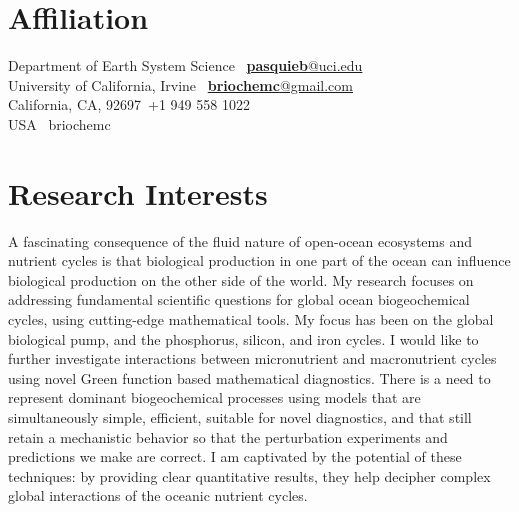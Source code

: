 \documentclass[]{friggeri-cv}
\begin{document}

\section{Affiliation}


    Department of Earth System Science \hfill
    \faEnvelope~\href{mailto:pasquieb@uci.edu}{\textbf{pasquieb}@uci.edu} \\
    University of California, Irvine \hfill
    \faEnvelope~\href{mailto:briochemc@gmail.com}{\textbf{briochemc}@gmail.com} \\
    California, CA, 92697\hfill \faMobile~+1 949 558 1022 \\
    USA \hfill \faSkype~briochemc



\section{Research Interests}
  A fascinating consequence of the fluid nature of open-ocean ecosystems and nutrient cycles is that biological production in one part of the ocean can influence biological production on the other side of the world.
  My research focuses on addressing fundamental scientific questions for global ocean biogeochemical cycles, using cutting-edge mathematical tools.
  My focus has been on the global biological pump, and the phosphorus, silicon, and iron cycles.
  I would like to further investigate interactions between micronutrient and macronutrient cycles using novel Green function based mathematical diagnostics.
  There is a need to represent dominant biogeochemical processes using models that are simultaneously simple, efficient, suitable for novel diagnostics, and that still retain a mechanistic behavior so that the perturbation experiments and predictions we make are correct.
  I am captivated by the potential of these techniques: by providing clear quantitative results, they help decipher complex global interactions of the oceanic nutrient cycles.
\end{document}
